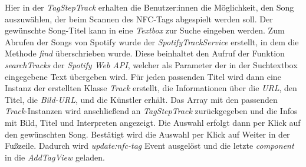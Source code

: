 \documentclass[10pt, a4paper]{article}
\begin{document}
\begin{onehalfspace}
Hier in der \textit{TagStepTrack} erhalten die Benutzer:innen die Möglichkeit, den Song auszuwählen, der beim Scannen des NFC-Tags abgespielt werden soll.
Der gewünschte Song-Titel kann in eine \textit{Textbox} zur Suche eingeben werden. Zum Abrufen der Songs von Spotify wurde der \textit{SpotifyTrackService} erstellt, in dem die Methode \textit{find} überschrieben wurde.
Diese beinhaltet den Aufruf der Funktion \textit{searchTracks} der \textit{Spotify Web API}, welcher als Parameter der in der Suchtextbox eingegebene Text übergeben wird.
Für jeden passenden Titel wird dann eine Instanz der erstellten Klasse \textit{Track} erstellt, die Informationen über die \textit{URL}, den Titel, die \textit{Bild-URL}, und die Künstler erhält.
Das Array mit den passenden \textit{Track}-Instanzen wird anschließend an \textit{TagStepTrack} zurückgegeben und die Infos mit Bild, Titel und Interpreten angezeigt. Die Auswahl erfolgt dann per Klick auf den gewünschten Song.
Bestätigt wird die Auswahl per Klick auf \glqq Weiter\grqq{} in der Fußzeile.
Dadurch wird \textit{update:nfc-tag} Event ausgelöst und die letzte \textit{component} in die \textit{AddTagView} geladen.
\\~\\

\end{onehalfspace}
\end{document}
